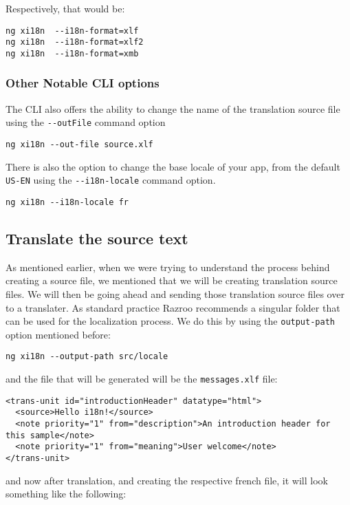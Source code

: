 Respectively, that would be: 
\begin{verbatim}
ng xi18n  --i18n-format=xlf
ng xi18n  --i18n-format=xlf2
ng xi18n  --i18n-format=xmb  
\end{verbatim}

\subsubsection{Other Notable CLI options}
The CLI also offers the ability to change the name of the translation source 
file using the \lstinline{--outFile} command option
\begin{verbatim}
ng xi18n --out-file source.xlf  
\end{verbatim}

There is also the option to change the base locale of your app, from the 
default \lstinline{US-EN} using the \lstinline{--i18n-locale} command option.
\begin{verbatim}
ng xi18n --i18n-locale fr
\end{verbatim}

\subsection{Translate the source text}
As mentioned earlier, when we were trying to understand the process behind 
creating a source file, we mentioned that we will be creating translation 
source files. We will then be going ahead and sending those translation 
source files over to a translater. As standard practice Razroo recommends
a singular folder that can be used for the localization process. We do this 
by using the \lstinline{output-path} option mentioned before:
\begin{verbatim}
ng xi18n --output-path src/locale  
\end{verbatim}

and the file that will be generated will be the \lstinline{messages.xlf} file:

\begin{lstlisting}[caption=src/locale/messages.xlf]
<trans-unit id="introductionHeader" datatype="html">
  <source>Hello i18n!</source>
  <note priority="1" from="description">An introduction header for this sample</note>
  <note priority="1" from="meaning">User welcome</note>
</trans-unit>
\end{lstlisting}

and now after translation, and creating the respective french file, it will 
look something like the following: 

